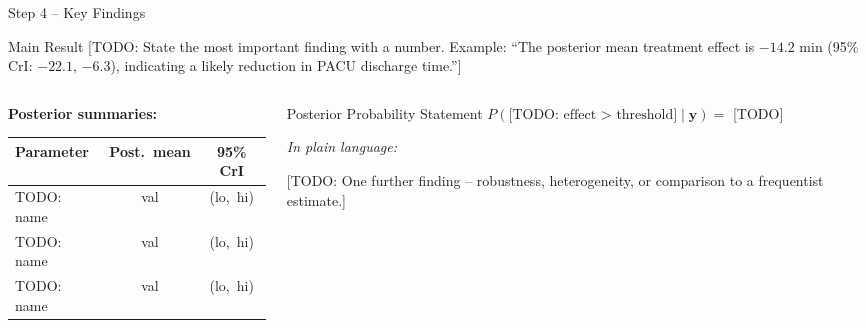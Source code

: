 \documentclass[aspectratio=169,11pt]{beamer}
\begin{document}
\begin{frame}{Step 4 -- Key Findings}

  \begin{alertblock}{Main Result}
    \small
    [TODO: State the most important finding with a number.
    Example: ``The posterior mean treatment effect is $-14.2$ min
    (95\% CrI: $-22.1$, $-6.3$), indicating a likely reduction
    in PACU discharge time.'']
  \end{alertblock}

  \vspace{5pt}

  \begin{columns}[T]
    \begin{column}{0.50\textwidth}
      \textbf{Posterior summaries:}
      \vspace{3pt}
      {\small
      \begin{tabular}{lcc}
        \toprule
        Parameter & Post.\ mean & 95\% CrI \tabularnewline
        \midrule
        TODO: name & val & (lo,\ hi) \tabularnewline
        TODO: name & val & (lo,\ hi) \tabularnewline
        TODO: name & val & (lo,\ hi) \tabularnewline
        \bottomrule
      \end{tabular}}
    \end{column}
    \begin{column}{0.46\textwidth}
      \begin{exampleblock}{Posterior Probability Statement}
        \small
        $P(\text{[TODO: effect > threshold]} \mid \mathbf{y}) = $ [TODO]\par
        \textit{In plain language:}\par
        [TODO: interpret this for a non-statistician]
      \end{exampleblock}
      \vspace{4pt}
      \small
      [TODO: One further finding -- robustness, heterogeneity,
      or comparison to a frequentist estimate.]
    \end{column}
  \end{columns}

\end{frame}
\end{document}
